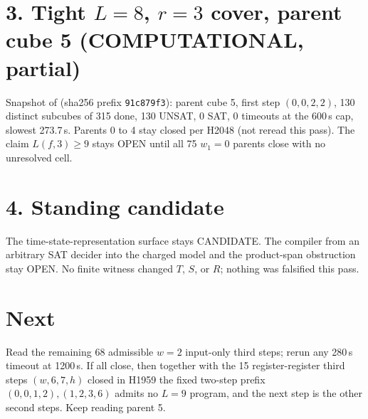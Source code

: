\documentclass[11pt]{article}
\begin{document}
\section*{3. Tight $L=8$, $r=3$ cover, parent cube 5 (COMPUTATIONAL, partial)}
Snapshot  of  (sha256 prefix \texttt{91c879f3}): parent cube 5, first step $(0,0,2,2)$, 130 distinct subcubes of 315 done, 130 UNSAT, 0 SAT, 0 timeouts at the 600\,s cap, slowest 273.7\,s. Parents 0 to 4 stay closed per H2048 (not reread this pass). The claim $L(f,3)\ge 9$ stays OPEN until all 75 $w_1=0$ parents close with no unresolved cell.

\section*{4. Standing candidate}
The time-state-representation surface stays CANDIDATE. The compiler from an arbitrary SAT decider into the charged model and the product-span obstruction stay OPEN. No finite witness changed $T$, $S$, or $R$; nothing was falsified this pass.

\section*{Next}
Read the remaining 68 admissible $w=2$ input-only third steps; rerun any 280\,s timeout at 1200\,s. If all close, then together with the 15 register-register third steps $(w,6,7,h)$ closed in H1959 the fixed two-step prefix $(0,0,1,2),(1,2,3,6)$ admits no $L=9$ program, and the next step is the other second steps. Keep reading parent 5.
\end{document}
